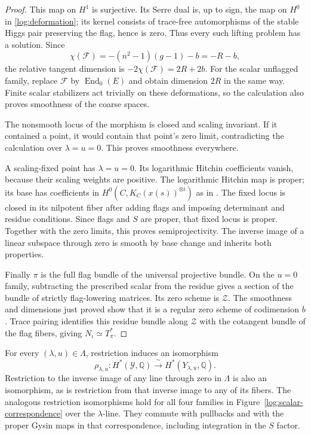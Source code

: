 \begin{proof}
This map on $H^1$ is surjective.  Its Serre dual is, up to sign, the map
on $H^0$ in \eqref{log:deformation}; its kernel consists of trace-free
automorphisms of the stable Higgs pair preserving the flag, hence is
zero.  Thus every such lifting problem has a solution.  Since
\[
 \chi(\mathcal F)=-(n^2-1)(g-1)-b=-R-b,
\]
the relative tangent dimension is $-2\chi(\mathcal F)=2R+2b$.
For the scalar unflagged family, replace $\mathcal F$ by
$\operatorname{End}_0(E)$ and obtain dimension $2R$ in the same way.
Finite scalar stabilizers act trivially on these deformations, so the
calculation also proves smoothness of the coarse spaces.

The nonsmooth locus of the morphism is closed and scaling invariant.
If it contained a point, it would contain that point's zero limit,
contradicting the calculation over $\lambda=u=0$.  This proves smoothness
everywhere.

A scaling-fixed point has $\lambda=u=0$.  Its logarithmic Hitchin
coefficients vanish, because their scaling weights are positive.
The logarithmic Hitchin map is proper; its base has coefficients in
$H^0(C,K_C(x(s))^{\otimes i})$ as in
\cite[Section~2.4, Equation~(4)]{dCFHLogHodge}.
The fixed locus is closed in its nilpotent fiber after adding flags
and imposing determinant and residue conditions.  Since flags and $S$
are proper, that fixed locus is proper.  Together with the zero limits,
this proves semiprojectivity.  The inverse image of a linear subspace
through zero is smooth by base change and inherits both properties.

Finally $\pi$ is the full flag bundle of the universal projective bundle.
On the $u=0$ family, subtracting the prescribed scalar from the residue
gives a section of the bundle of strictly flag-lowering matrices.
Its zero scheme is $\mathcal Z$.  The smoothness and dimensions just
proved show that it is a regular zero scheme of codimension $b$.
Trace pairing identifies this residue bundle along $\mathcal Z$ with
the cotangent bundle of the flag fibers, giving $N_\iota\simeq T_\pi^*$.
\end{proof}

\begin{corollary}
\label{log:restriction}
For every $(\lambda,u)\in\Lambda$, restriction induces an isomorphism
\begin{equation}
 \rho_{\lambda,u}:H^*(\mathcal Y,\mathbb Q)
       \xrightarrow{\ \sim\ }H^*(Y_{\lambda,u},\mathbb Q).
 \label{log:rho}
\end{equation}
Restriction to the inverse image of any line through zero in $\Lambda$
is also an isomorphism, as is restriction from that inverse image to any
of its fibers.  The analogous restriction isomorphisms hold for all
four families in Figure~\ref{log:scalar-correspondence} over the
$\lambda$-line.  They commute with pullbacks and with the proper Gysin
maps in that correspondence, including integration in the $S$ factor.
\end{corollary}


